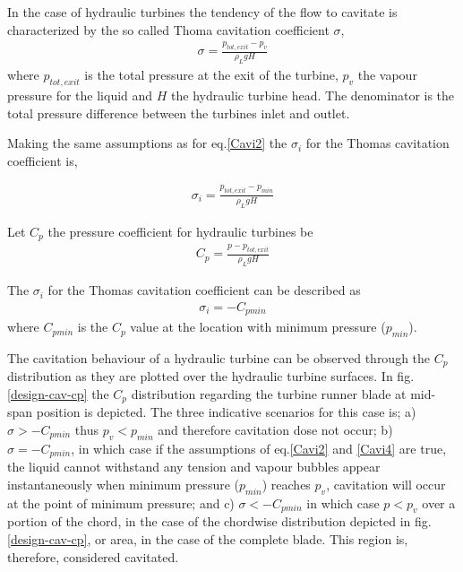In the case of hydraulic turbines the tendency of the flow to cavitate is characterized by the so called Thoma cavitation coefficient $\sigma$, 
\begin{eqnarray}
		\sigma=\frac{p_{tot,exit}-p_{v}}{\rho_{L}gH}
\label{Cavi3}
\end{eqnarray}
where $p_{tot,exit}$ is the total pressure at the exit of the turbine, $p_v$ the vapour pressure for the liquid and $H$ the hydraulic turbine head. The denominator is the total pressure difference between the turbines inlet and outlet.   

Making the same assumptions as for eq.\ref{Cavi2} the $\sigma_i$ for the Thomas cavitation coefficient  is, 

\begin{eqnarray}
		\sigma_i=\frac{p_{tot,exit}-p_{min}}{\rho_{L}gH}
\label{Cavi4}
\end{eqnarray}

Let $C_p$ the pressure coefficient for hydraulic turbines be 
\begin{eqnarray}
		C_p=\frac{p-p_{tot,exit}}{\rho_{L}gH}
\label{Cpdef}
\end{eqnarray}

The $\sigma_i$ for the Thomas cavitation coefficient can be described as 
\begin{eqnarray}
		\sigma_i=-C_{pmin}
\label{Cavi6}
\end{eqnarray}
where $C_{pmin}$ is the $C_p$ value at the location with minimum pressure ($p_{min}$).

The cavitation behaviour of a hydraulic turbine can be observed through the $C_p$ distribution as they are plotted over the hydraulic turbine surfaces.  In fig. \ref{design-cav-cp} the $C_p$ distribution regarding the turbine runner blade at mid-span position is depicted. The three indicative scenarios for this case is; a) $\sigma>-C_{pmin}$ thus $p_v<p_{min}$ and therefore cavitation dose not occur; b)  $\sigma=-C_{pmin}$, in which case if the assumptions of eq.\ref{Cavi2} and \ref{Cavi4} are true, the liquid cannot withstand any tension and vapour bubbles appear instantaneously when minimum pressure ($p_{min}$) reaches $p_{v}$, cavitation will occur at the point of minimum pressure; and c) $\sigma<-C_{pmin}$ in which case $p<p_v$ over a portion of the chord, in the case of the chordwise distribution depicted in fig. \ref{design-cav-cp}, or area, in the case of the complete blade. This region is, therefore, considered cavitated.     

